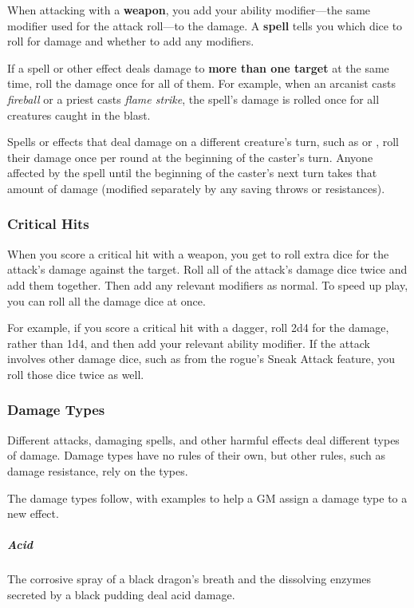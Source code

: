 When attacking with a \textbf{weapon}, you add your ability modifier—the same modifier used for the attack roll—to the damage. A \textbf{spell} tells you which dice to roll for damage and whether to add any modifiers.

If a spell or other effect deals damage to \textbf{more than one target} at the same time, roll the damage once for all of them. For example, when an arcanist casts \textit{fireball} or a priest casts \textit{flame strike}, the spell's damage is rolled once for all creatures caught in the blast.

Spells or effects that deal damage on a different creature's turn, such as  or , roll their damage once per round at the beginning of the caster's turn. Anyone affected by the spell until the beginning of the caster's next turn takes that amount of damage (modified separately by any saving throws or resistances).

\subsubsection{Critical Hits}

When you score a critical hit with a weapon, you get to roll extra dice for the attack's damage against the target. Roll all of the attack's damage dice twice and add them together. Then add any relevant modifiers as normal. To speed up play, you can roll all the damage dice at once.

For example, if you score a critical hit with a dagger, roll 2d4 for the damage, rather than 1d4, and then add your relevant ability modifier. If the attack involves other damage dice, such as from the rogue's Sneak Attack feature, you roll those dice twice as well.

\subsubsection{Damage Types}

Different attacks, damaging spells, and other harmful effects deal different types of damage. Damage types have no rules of their own, but other rules, such as damage resistance, rely on the types.

The damage types follow, with examples to help a GM assign a damage type to a new effect.

\subparagraph*{Acid} The corrosive spray of a black dragon's breath and the dissolving enzymes secreted by a black pudding deal acid damage.

